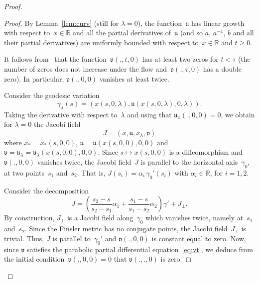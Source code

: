 \documentclass[AHL,Unicode,longabstracts,published]{cedram}
\newcommand{\R}{\mathbb{R}}
\newcommand{\bu}{\mathfrak{u}}
\newcommand{\bv}{\mathfrak{v}}
\begin{document}
\begin{proof}
\begin{proof}

By Lemma~\ref{lem:curv} (still for $\lambda=0$), the function~$\bu$ has linear growth with respect to~$x \in \R$ and all the partial derivatives of~$\bu$ (and so $a$, $a^{-1}$, $b$ and all their partial derivatives) are uniformly bounded with respect to~$x \in \R$ and $t \geq 0$.

It follows from~\cite[Theorem~B]{An88} that the function~$\bv(.,t,0)$ has at least two zeros for $t < \tau$ (the number of zeros does not increase under the flow and~$\bv(.,\tau,0)$ has a double zero). In particular, $\bv(.,0,0)$ vanishes at least twice.



Consider the geodesic variation
\[
\gamma_\lambda(s) = (x(s,0,\lambda), \bu(x(s,0,\lambda),0,\lambda)).
\]
Taking the derivative with respect to~$\lambda$ and using that $\bu_x(.,0,0)=0$, we obtain for $\lambda=0$ the Jacobi field
\[
J=(x,\bu,x_\lambda, \bv)
\]
where $x_* = x_*(s,0,0)$, $\bu = \bu(x(s,0,0),0,0)$ and $\bv = \bu_\lambda = \bu_\lambda(x(s,0,0),0,0)$. Since $s \mapsto x(s,0,0)$ is a diffeomorphism and $\bv(.,0,0)$ vanishes twice, the Jacobi field~$J$ is parallel to the horizontal axis~$\gamma_0$, at two points~$s_1$ and~$s_2$. That is, $J(s_i) = \alpha_i \, \gamma_0'(s_i)$ with $\alpha_i \in \R$, for $i=1,2$.

Consider the decomposition
\[
J = \left(\frac{s_2-s}{s_2-s_1} \alpha_1 + \frac{s_1-s}{s_1-s_2} \alpha_2 \right) \gamma' + J_\perp.
\]
By construction, $J_\perp$ is a Jacobi field along~$\gamma_0$ which vanishes twice, namely at~$s_1$ and~$s_2$. Since the Finsler metric has no conjugate points, the Jacobi field~$J_\perp$ is trivial. Thus, $J$ is parallel to~$\gamma_0'$ and $\bv(.,0,0)$ is constant equal to zero. Now, since $\bv$ satisfies the parabolic partial differential equation~\eqref{eq:vt}, we deduce from the initial condition~$\bv(.,0,0)=0$ that $\bv(.,.,0)$ is zero.
\end{proof}


\end{proof}
\end{document}
